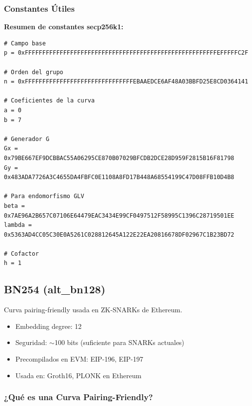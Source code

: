 \documentclass[11pt,a4paper,twoside,openright]{book}
\theoremstyle{definition}
\theoremstyle{plain}
\theoremstyle{remark}
\begin{document}
\subsubsection{Constantes Útiles}

\begin{mathnote}
\textbf{Resumen de constantes secp256k1:}

\begin{verbatim}
# Campo base
p = 0xFFFFFFFFFFFFFFFFFFFFFFFFFFFFFFFFFFFFFFFFFFFFFFFFFFFFFFFEFFFFFC2F

# Orden del grupo
n = 0xFFFFFFFFFFFFFFFFFFFFFFFFFFFFFFFEBAAEDCE6AF48A03BBFD25E8CD0364141

# Coeficientes de la curva
a = 0
b = 7

# Generador G
Gx = 0x79BE667EF9DCBBAC55A06295CE870B07029BFCDB2DCE28D959F2815B16F81798
Gy = 0x483ADA7726A3C4655DA4FBFC0E1108A8FD17B448A68554199C47D08FFB10D4B8

# Para endomorfismo GLV
beta = 0x7AE96A2B657C07106E64479EAC3434E99CF0497512F58995C1396C28719501EE
lambda = 0x5363AD4CC05C30E0A5261C028812645A122E22EA20816678DF02967C1B23BD72

# Cofactor
h = 1
\end{verbatim}
\end{mathnote}


\subsection{BN254 (alt\_bn128)}

Curva pairing-friendly usada en ZK-SNARKs de Ethereum.
\begin{itemize}
    \item Embedding degree: 12
    \item Seguridad: $\sim$100 bits (suficiente para SNARKs actuales)
    \item Precompilados en EVM: EIP-196, EIP-197
    \item Usada en: Groth16, PLONK en Ethereum
\end{itemize}

\subsubsection{¿Qué es una Curva Pairing-Friendly?}
\end{document}
